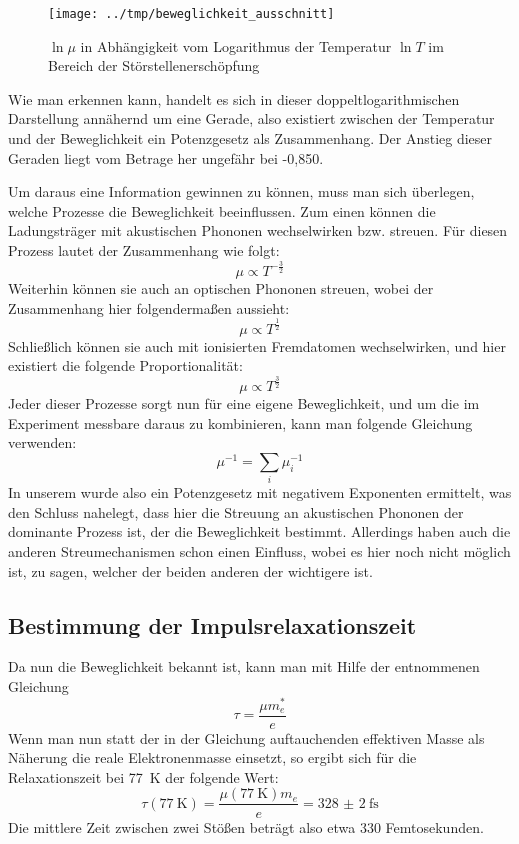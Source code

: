 \begin{figure}[htb]
   \centering
   \texttt{[image: ../tmp/beweglichkeit\_ausschnitt]}
   \caption{$\ln μ$ in Abhängigkeit vom Logarithmus der Temperatur $\ln T$ im Bereich der Störstellenerschöpfung}
   \label{fig:beweglichkeit_ausschnitt}
\end{figure}

Wie man erkennen kann, handelt es sich in dieser doppeltlogarithmischen
Darstellung annähernd um eine Gerade, also existiert zwischen der Temperatur
und der Beweglichkeit ein Potenzgesetz als Zusammenhang. Der Anstieg dieser
Geraden liegt vom Betrage her ungefähr bei -0,850.

Um daraus eine Information gewinnen zu können, muss man sich überlegen, welche
Prozesse die Beweglichkeit beeinflussen. Zum einen können die Ladungsträger mit
akustischen Phononen wechselwirken bzw. streuen. Für diesen Prozess lautet der
Zusammenhang wie folgt:
\begin{equation}
μ \propto T^{-\frac{3}{2}}
\end{equation}
Weiterhin können sie auch an optischen Phononen streuen, wobei der Zusammenhang
hier folgendermaßen aussieht:
\begin{equation}
μ \propto T^{\frac{1}{2}}
\end{equation}
Schließlich können sie auch mit ionisierten Fremdatomen wechselwirken, und hier
existiert die folgende Proportionalität:
\begin{equation}
μ \propto T^{\frac{3}{2}}
\end{equation}
Jeder dieser Prozesse sorgt nun für eine eigene Beweglichkeit, und um die im
Experiment messbare daraus zu kombinieren, kann man folgende Gleichung
verwenden:
\begin{equation}
μ^{-1} = \sum_i μ_i^{-1}
\end{equation}
In unserem wurde also ein Potenzgesetz mit negativem Exponenten ermittelt, was
den Schluss nahelegt, dass hier die Streuung an akustischen Phononen der
dominante Prozess ist, der die Beweglichkeit bestimmt. Allerdings haben auch
die anderen Streumechanismen schon einen Einfluss, wobei es hier noch nicht
möglich ist, zu sagen, welcher der beiden anderen der wichtigere ist.

\subsection{Bestimmung der Impulsrelaxationszeit}

Da nun die Beweglichkeit bekannt ist, kann man mit Hilfe der \cite[Gl.
(6.37)]{bergmann} entnommenen Gleichung
\begin{equation}
τ = \frac{μm^{\ast}_e}{e}
\end{equation}
Wenn man nun statt der in der Gleichung auftauchenden effektiven Masse als
Näherung die reale Elektronenmasse einsetzt, so ergibt sich für die
Relaxationszeit bei \SI{77}{\kelvin} der folgende Wert:
\begin{equation}
τ(\SI{77}{\kelvin})= \frac{μ(\SI{77}{\kelvin})m_e}{e}=\SI{328(2)}{\femto\second}
\end{equation}
Die mittlere Zeit zwischen zwei Stößen beträgt also etwa 330 Femtosekunden.

